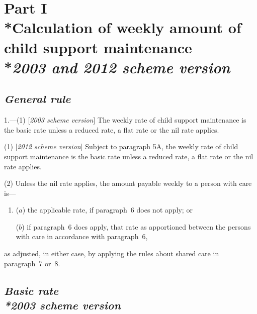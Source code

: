 \documentclass[12pt,a4paper]{article}
\begin{document}
\section[Part I --- Calculation of weekly amount of child support maintenance --- \emph{2003 and 2012 scheme version}]{Part I\\*Calculation of weekly amount of child support maintenance\\*\emph{2003 and 2012 scheme version}}


\subsection*{\itshape General rule}

1.---(1) [\emph{2003 scheme version}] The weekly rate of child support maintenance is the basic rate unless a reduced rate, a flat rate or the nil rate applies.

(1) [\emph{2012 scheme version}]
Subject to paragraph 5A,  %
the weekly rate of child support maintenance is the basic rate unless a reduced rate, a flat rate or the nil rate applies.

(2) Unless the nil rate applies, the amount payable weekly to a person with care is—
\begin{enumerate}\item[]
($a$) the applicable rate, if paragraph~6 does not apply; or

($b$) if paragraph~6 does apply, that rate as apportioned between the persons with care in accordance with paragraph~6,
\end{enumerate}
as adjusted, in either case, by applying the rules about shared care in paragraph~7 or~8. 


\subsection*{\itshape Basic rate\\*\emph{2003 scheme version}}
\end{document}
